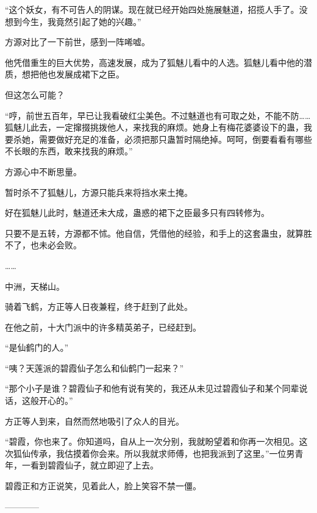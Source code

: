 \begin{this_body}
“这个妖女，有不可告人的阴谋。现在就已经开始四处施展魅道，招揽人手了。没想到今生，我竟然引起了她的兴趣。”

方源对比了一下前世，感到一阵唏嘘。

他凭借重生的巨大优势，高速发展，成为了狐魅儿看中的人选。狐魅儿看中他的潜质，想把他也发展成裙下之臣。

但这怎么可能？

“哼，前世五百年，早已让我看破红尘美色。不过魅道也有可取之处，不能不防……狐魅儿此去，一定撺掇挑拨他人，来找我的麻烦。她身上有梅花婆婆设下的蛊，我要杀她，需要做好充足的准备，必须把那只蛊暂时隔绝掉。呵呵，倒要看看有哪些不长眼的东西，敢来找我的麻烦。”

方源心中不断思量。

暂时杀不了狐魅儿，方源只能兵来将挡水来土掩。

好在狐魅儿此时，魅道还未大成，蛊惑的裙下之臣最多只有四转修为。

只要不是五转，方源都不怵。他自信，凭借他的经验，和手上的这套蛊虫，就算胜不了，也未必会败。

……

中洲，天梯山。

骑着飞鹤，方正等人日夜兼程，终于赶到了此处。

在他之前，十大门派中的许多精英弟子，已经赶到。

“是仙鹤门的人。”

“咦？天莲派的碧霞仙子怎么和仙鹤门一起来？”

“那个小子是谁？碧霞仙子和他有说有笑的，我还从未见过碧霞仙子和某个同辈说话，这般开心的。”

方正等人到来，自然而然地吸引了众人的目光。

“碧霞，你也来了。你知道吗，自从上一次分别，我就盼望着和你再一次相见。这次狐仙传承，我估摸着你会来。所以我就求师傅，也把我派到了这里。”一位男青年，一看到碧霞仙子，就立即迎了上去。

碧霞正和方正说笑，见着此人，脸上笑容不禁一僵。

------------

\end{this_body}

